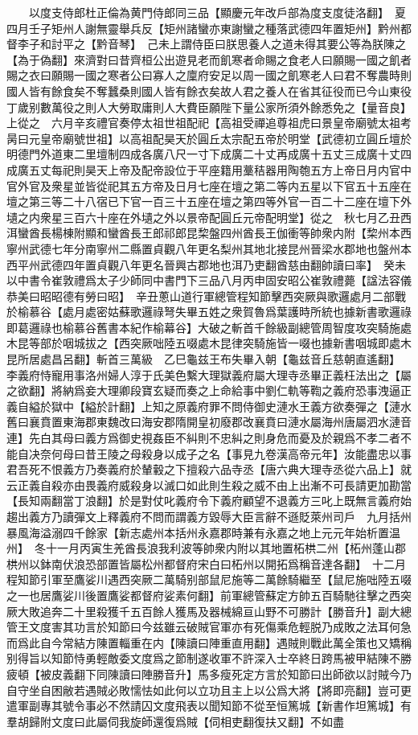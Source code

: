 　　以度支侍郎杜正倫為黄門侍郎同三品【顯慶元年改戶部為度支度徒洛翻】　夏四月壬子矩州人謝無靈舉兵反【矩州諸蠻亦東謝蠻之種落武德四年置矩州】黔州都督李子和討平之【黔音琴】　己未上謂侍臣曰朕思養人之道未得其要公等為朕陳之【為于偽翻】來濟對曰昔齊桓公出遊見老而飢寒者命賜之食老人曰願賜一國之飢者賜之衣曰願賜一國之寒者公曰寡人之廩府安足以周一國之飢寒老人曰君不奪農時則國人皆有餘食矣不奪蠶桑則國人皆有餘衣矣故人君之養人在省其征役而已今山東役丁歲别數萬役之則人大勞取庸則人大費臣願陛下量公家所須外餘悉免之【量音良】上從之　六月辛亥禮官奏停太祖世祖配祀【高祖受禪追尊祖虎曰景皇帝廟號太祖考昺曰元皇帝廟號世祖】以高祖配昊天於圓丘太宗配五帝於明堂【武德初立圓丘壇於明德門外道東二里壇制四成各廣八尺一寸下成廣二十丈再成廣十五丈三成廣十丈四成廣五丈每祀則昊天上帝及配帝設位于平座籍用藳秸器用陶匏五方上帝日月内官中官外官及衆星並皆從祀其五方帝及日月七座在壇之第二等内五星以下官五十五座在壇之第三等二十八宿已下官一百三十五座在壇之第四等外官一百二十二座在壇下外壝之内衆星三百六十座在外壝之外以景帝配圓丘元帝配明堂】從之　秋七月乙丑西洱蠻酋長楊棟附顯和蠻酋長王郎祁郎昆棃盤四州酋長王伽衝等帥衆内附【棃州本西寧州武德七年分南寧州二縣置貞觀八年更名梨州其地北接昆州晉梁水郡地也盤州本西平州武德四年置貞觀八年更名晉興古郡地也洱乃吏翻酋慈由翻帥讀曰率】　癸未以中書令崔敦禮爲太子少師同中書門下三品八月丙申固安昭公崔敦禮薨【諡法容儀恭美曰昭昭德有勞曰昭】　辛丑蔥山道行軍總管程知節擊西突厥與歌邏處月二部戰於榆慕谷【處月處密姑蘇歌邏祿弩失畢五姓之衆賀魯爲葉護時所統也據新書歌邏祿即葛邏祿也榆慕谷舊書本紀作榆幕谷】大破之斬首千餘級副總管周智度攻突騎施處木昆等部於咽城拔之【西突厥咄陸五啜處木昆律突騎施皆一啜也據新書咽城即處木昆所居處昌呂翻】斬首三萬級　乙巳龜兹王布失畢入朝【龜兹音丘慈朝直遙翻】　李義府恃寵用事洛州婦人淳于氏美色繫大理獄義府屬大理寺丞畢正義枉法出之【屬之欲翻】將納爲妾大理卿段寶玄疑而奏之上命給事中劉仁軌等鞫之義府恐事洩逼正義自縊於獄中【縊於計翻】上知之原義府罪不問侍御史漣水王義方欲奏彈之【漣水舊曰襄賁置東海郡東魏改曰海安郡隋開皇初廢郡改襄賁曰漣水屬海州唐屬泗水漣音連】先白其母曰義方爲御史視姦臣不糾則不忠糾之則身危而憂及於親爲不孝二者不能自决奈何母曰昔王陵之母殺身以成子之名【事見九卷漢高帝元年】汝能盡忠以事君吾死不恨義方乃奏義府於輦轂之下擅殺六品寺丞【唐六典大理寺丞從六品上】就云正義自殺亦由畏義府威殺身以滅口如此則生殺之威不由上出漸不可長請更加勘當【長知兩翻當丁浪翻】於是對仗叱義府令下義府顧望不退義方三叱上既無言義府始趨出義方乃讀彈文上釋義府不問而謂義方毀辱大臣言辭不遜貶萊州司戶　九月括州暴風海溢溺四千餘家【新志處州本括州永嘉郡時兼有永嘉之地上元元年始析置温州】　冬十一月丙寅生羌酋長浪我利波等帥衆内附以其地置柘栱二州【柘州蓬山郡栱州以鉢南伏浪恐部置皆屬松州都督府宋白曰柘州以開拓爲稱音達各翻】　十二月程知節引軍至鷹娑川遇西突厥二萬騎别部鼠尼施等二萬餘騎繼至【鼠尼施咄陸五啜之一也居鷹娑川後置鷹娑都督府娑素何翻】前軍總管蘇定方帥五百騎馳往擊之西突厥大敗追奔二十里殺獲千五百餘人獲馬及器械綿亘山野不可勝計【勝音升】副大總管王文度害其功言於知節曰今兹雖云破賊官軍亦有死傷乘危輕脱乃成敗之法耳何急而爲此自今常結方陳置輜重在内【陳讀曰陣重直用翻】遇賊則戰此萬全策也又矯稱别得旨以知節恃勇輕敵委文度爲之節制遂收軍不許深入士卒終日跨馬被甲結陳不勝疲頓【被皮義翻下同陳讀曰陣勝音升】馬多瘦死定方言於知節曰出師欲以討賊今乃自守坐自困敝若遇賊必敗懦怯如此何以立功且主上以公爲大將【將即亮翻】豈可更遣軍副專其號令事必不然請囚文度飛表以聞知節不從至恒篤城【新書作坦篤城】有羣胡歸附文度曰此屬伺我旋師還復爲賊【伺相吏翻復扶又翻】不如盡